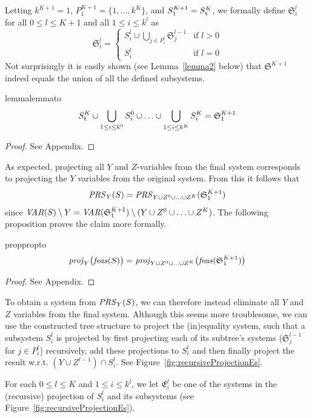 Letting $k^{K+1}=1$, $P^{K+1}_1 = \{1,\ldots, k^K\}$, and $S^{K+1}_1 = S^K_{\texttt{t}}$, we formally define $\mathfrak{S}^l_i$ for all $0 \leq l \leq K+1$ and all $1\leq i \leq k^l$ as
\[
\mathfrak{S}^l_i = \left\{\begin{array}{ll}
		S^l_i \cup\bigcup_{j\in P^l_i}\mathfrak{S}^{l-1}_j&\text{if }l>0\\
		S^l_i&\text{if } l=0
\end{array}\right.
\]
Not surprisingly it is easily shown (see Lemma~\ref{lemma2} below) that $\mathfrak{S}^{K+1}$ indeed equals the union of all the defined subsystems.
\begin{restatable}{lemma}{lemmato}\label{lemma2}
\[
S^K_{\texttt{t}}\cup\bigcup_{1\leq i\leq k^0}S^0_i\cup\ldots\cup\bigcup_{1\leq i\leq k^K} S^K_i = \mathfrak{S}^{K+1}_1
\]
\end{restatable}
\begin{proof}
See Appendix.
\end{proof}
%
\noindent As expected, projecting all $Y$ and $Z$-variables from the final system corresponds to projecting the $Y$ variables from the original system. From this it follows that 
\begin{equation}\label{eq:projYZ}
\mathit{PRS}_Y(S) = \mathit{PRS}_{Y\cup Z^0\cup \ldots \cup Z^K}(\mathfrak{S}^{K+1}_1)
\end{equation}
since $\mathit{VAR}(S)\setminus Y = \mathit{VAR}(\mathfrak{S}^{K+1}_1)\setminus(Y\cup Z^0\cup \ldots \cup Z^K)$. 
The following proposition proves the claim more formally.
\begin{restatable}{prop}{propto}\label{prop:2}
\[
\mathit{proj}_Y\big(\mathit{feas}(S)\big) = \mathit{proj}_{Y\cup Z^0\cup \ldots \cup Z^K}\big(\mathit{feas}(\mathfrak{S}^{K+1}_1)\big) 
\]
\end{restatable}
\begin{proof}
See Appendix.
\end{proof}
%
\noindent To obtain a system from $\mathit{PRS}_Y(S)$, we can therefore instead eliminate all $Y$ and $Z$ variables from the final system. Although this seems more troublesome, we can use the constructed tree structure to project the (in)equality system, such that a subsystem $S^l_i$ is projected by first projecting each of its subtree's systems ($\mathfrak{S}^{l-1}_j$ for $j\in P^l_i$) recursively, add these projections to $S^l_i$ and then finally project the result w.r.t. $(Y\cup Z^{l-1})\cap S^l_i$. See Figure~\ref{fig:recursiveProjectionEs}.



For each $0\leq l\leq K$ and $1\leq i \leq k^l$, we let $\mathfrak{E}^l_i$ be one of the systems in the (recursive) projection of $S^l_i$ and its subsystems (see Figure~\ref{fig:recursiveProjectionEs}). 

